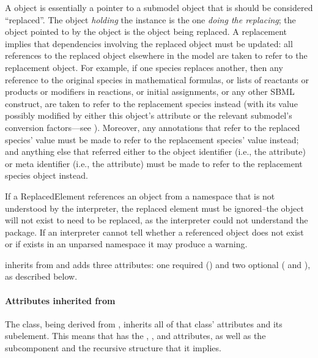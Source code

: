 A \ReplacedElement object is essentially a pointer to a submodel object
that is should be considered ``replaced''.  The object \emph{holding}
the \ReplacedElement instance is the one \emph{doing the replacing}; the
object pointed to by the \ReplacedElement object is the object being
replaced.  A replacement implies that dependencies involving the
replaced object must be updated: all references to the replaced object
elsewhere in the model are taken to refer to the replacement object.
For example, if one species replaces another, then any reference to the
original species in mathematical formulas, or lists of reactants or
products or modifiers in reactions, or initial assignments, or any other
SBML construct, are taken to refer to the replacement species instead
(with its value possibly modified by either this object's
 attribute or the relevant submodel's conversion
factors---see ).  Moreover, any annotations
that refer to the replaced species'  value must be made to
refer to the replacement species'  value instead; and
anything else that referred either to the object identifier (i.e., the
 attribute) or meta identifier (i.e., the 
attribute) must be made to refer to the replacement species object
instead.

If a ReplacedElement references an object from a namespace that is not
understood by the interpreter, the replaced element must be ignored--the 
object will not exist to need to be replaced, as the interpreter could not
understand the package.  If an interpreter cannot tell whether 
a referenced object does not exist or if exists in an unparsed namespace
it may produce a warning.

\ReplacedElement inherits from \SBaseRef and adds three attributes: one
required () and two optional ( and
), as described below.


\paragraph{Attributes inherited from }

The \ReplacedElement class, being derived from \SBaseRef, inherits all
of that class' attributes and its subelement.  This means that
\ReplacedElement has the , , 
and  attributes, as well as the subcomponent
 and the recursive structure that it implies.

